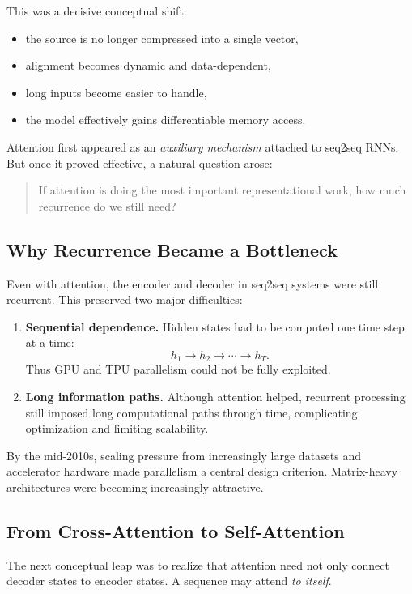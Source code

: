 This was a decisive conceptual shift:
\begin{itemize}
    \item the source is no longer compressed into a single vector,
    \item alignment becomes dynamic and data-dependent,
    \item long inputs become easier to handle,
    \item the model effectively gains differentiable memory access.
\end{itemize}

Attention first appeared as an \emph{auxiliary mechanism} attached to seq2seq RNNs. But once it proved effective, a natural question arose:

\begin{quote}
If attention is doing the most important representational work, how much recurrence do we still need?
\end{quote}

\subsection{Why Recurrence Became a Bottleneck}

Even with attention, the encoder and decoder in seq2seq systems were still recurrent. This preserved two major difficulties:
\begin{enumerate}
    \item \textbf{Sequential dependence.} Hidden states had to be computed one time step at a time:
    \[
    h_1 \to h_2 \to \cdots \to h_T.
    \]
    Thus GPU and TPU parallelism could not be fully exploited.
    \item \textbf{Long information paths.} Although attention helped, recurrent processing still imposed long computational paths through time, complicating optimization and limiting scalability.
\end{enumerate}

By the mid-2010s, scaling pressure from increasingly large datasets and accelerator hardware made parallelism a central design criterion. Matrix-heavy architectures were becoming increasingly attractive.

\subsection{From Cross-Attention to Self-Attention}

The next conceptual leap was to realize that attention need not only connect decoder states to encoder states. A sequence may attend \emph{to itself}.

